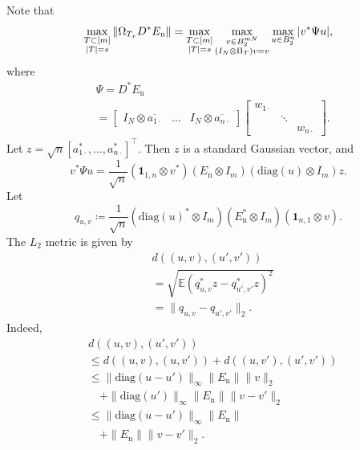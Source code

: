 \documentclass[11pt,journal]{IEEEtran}
\newcommand{\rmn}{\mathrm{n}}
\newcommand{\norm}[1]{\|{#1}\|}
\newcommand{\T}{\top}
\begin{document}


\begin{IEEEproof}
Note that
\begin{align*}
\max_{\begin{subarray}{c} T \subset [m] \\ |T| = s \end{subarray}}\norm{\Omega_{T_x}D^*E_\rmn}   = \max_{\begin{subarray}{c} T \subset [m] \\ |T| = s \end{subarray}} 
\max_{\begin{subarray}{c} v \in B_2^{mN} \\ (I_N \otimes \Pi_T) v = v \end{subarray}} \max_{u \in B_2^n} |v^* \Psi u|,
\end{align*}
where
\begin{align*}
& \Psi = D^* E_\rmn \\
& = \begin{bmatrix}
I_N \otimes \overline{a_{1\cdot}} & \dots & I_N \otimes \overline{a_{n\cdot}}
\end{bmatrix}
\begin{bmatrix}
w_{1\cdot} & & \\
& \ddots & \\
& & w_{n\cdot}
\end{bmatrix}.
\end{align*}
Let ${z} = \sqrt{n} [a_{1\cdot}^*,\dots,a_{n\cdot}^*]^\T$. Then ${z}$ is a standard Gaussian vector, and
\[
v^* \Psi u
= \frac{1}{\sqrt{n}} (\mathbf{1}_{1,n} \otimes v^*) (E_\rmn \otimes I_m) (\mathrm{diag}(u) \otimes I_m) {z}.
\]
Let
\[
q_{u,v} \coloneqq \frac{1}{\sqrt{n}} (\mathrm{diag}(u)^* \otimes I_m) (E_\rmn^* \otimes I_m) (\mathbf{1}_{n,1} \otimes v).
\]
The $L_2$ metric is given by
\begin{align*}
& d((u,v),(u',v')) \\
& = \sqrt{\mathbb{E} (q_{u,v}^* {z} - q_{u',v'}^* {z})^2} \\
& = \norm{q_{u,v} - q_{u',v'}}_2.
\end{align*}
Indeed,
\begin{align*}
& d((u,v),(u',v')) \\
& \leq d((u,v),(u,v')) + d((u,v'),(u',v')) \\
& \leq \norm{\mathrm{diag}(u-u')}_\infty \norm{E_{\mathrm{n}}} \norm{v}_2 \\
& \quad + \norm{\mathrm{diag}(u')}_\infty \norm{E_{\mathrm{n}}} \norm{v-v'}_2 \\
& \leq \norm{\mathrm{diag}(u-u')}_\infty \norm{E_{\mathrm{n}}} \\
& \quad + \norm{E_{\mathrm{n}}} \norm{v-v'}_2.
\end{align*}


\end{IEEEproof}
\end{document}
